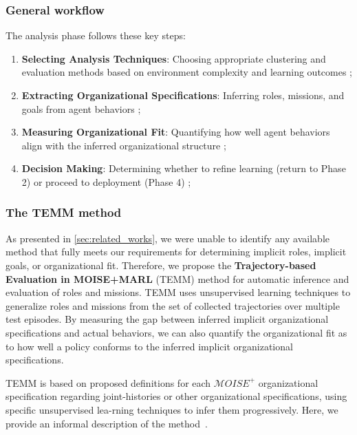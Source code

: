 \documentclass[pdflatex,sn-mathphys-num]{sn-jnl}%
\theoremstyle{thmstyleone}%
\theoremstyle{thmstyletwo}%
\theoremstyle{thmstylethree}%
\begin{document}
\subsubsection{General workflow}
The analysis phase follows these key steps:
\begin{enumerate}
    \item \textbf{Selecting Analysis Techniques}: Choosing appropriate clustering and evaluation methods based on environment complexity and learning outcomes ;
    \item \textbf{Extracting Organizational Specifications}: Inferring roles, missions, and goals from agent behaviors ;
    \item \textbf{Measuring Organizational Fit}: Quantifying how well agent behaviors align with the inferred organizational structure ;
    \item \textbf{Decision Making}: Determining whether to refine learning (return to Phase 2) or proceed to deployment (Phase 4) ;
\end{enumerate}

\subsubsection{The TEMM method}
\label{sec:TEMM_algorithm}

As presented in \autoref{sec:related_works}, we were unable to identify any available method that fully meets our requirements for determining implicit roles, implicit goals, or organizational fit. Therefore, we propose the \textbf{Trajectory-based Evaluation in MOISE+MARL} (TEMM) method for automatic inference and evaluation of roles and missions.
%
TEMM uses unsupervised learning techniques to generalize roles and missions from the set of collected trajectories over multiple test episodes. By measuring the gap between inferred implicit organizational specifications and actual behaviors, we can also quantify the organizational fit as to how well a policy conforms to the inferred implicit organizational specifications.

TEMM is based on proposed definitions for each $\mathcal{M}OISE^+$ organizational specification regarding joint-histories or other organizational specifications, using specific unsupervised lea-rning techniques to infer them progressively. Here, we provide an informal description of the method~\hyperref[fn:github]{\footnotemark[1]}.
%
\end{document}
